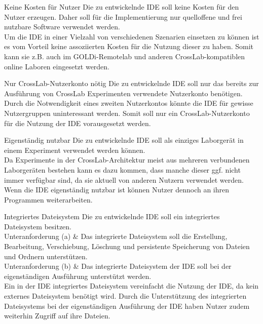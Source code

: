 \begin{requirement}{Keine Kosten für Nutzer}
    \reqdescription Die zu entwickelnde IDE soll keine Kosten für den Nutzer erzeugen. Daher soll für die Implementierung nur quelloffene und frei nutzbare Software verwendet werden.  \\
    \reqrationale Um die IDE in einer Vielzahl von verschiedenen Szenarien einsetzen zu können ist es vom Vorteil keine assoziierten Kosten für die Nutzung dieser zu haben. Somit kann sie z.B. auch im GOLDi-Remotelab und anderen CrossLab-kompatiblen online Laboren eingesetzt werden. \\
\end{requirement}

\begin{requirement}{Nur CrossLab-Nutzerkonto nötig}
    \reqdescription Die zu entwickelnde IDE soll nur das bereits zur Ausführung von CrossLab Experimenten verwendete Nutzerkonto benötigen. \\
    \reqrationale Durch die Notwendigkeit eines zweiten Nutzerkontos könnte die IDE für gewisse Nutzergruppen uninteressant werden. Somit soll nur ein CrossLab-Nutzerkonto für die Nutzung der IDE vorausgesetzt werden. \\
\end{requirement}

\begin{requirement}{Eigenständig nutzbar}
    \reqdescription Die zu entwickelnde IDE soll als einziges Laborgerät in einem Experiment verwendet werden können. \\
    \reqrationale Da Experimente in der CrossLab-Architektur meist aus mehreren verbundenen Laborgeräten bestehen kann es dazu kommen, dass manche dieser ggf. nicht immer verfügbar sind, da sie aktuell von anderen Nutzern verwendet werden. Wenn die IDE eigenständig nutzbar ist können Nutzer dennoch an ihren Programmen weiterarbeiten. \\
\end{requirement}

\begin{requirement}{Integriertes Dateisystem}
    \reqdescription Die zu entwickelnde IDE soll ein integriertes Dateisystem besitzen. \\
    Unteranforderung (a) & Das integrierte Dateisystem soll die Erstellung, Bearbeitung, Verschiebung, Löschung und persistente Speicherung von Dateien und Ordnern unterstützen. \\
    Unteranforderung (b) & Das integrierte Dateisystem der IDE soll bei der eigenständigen Ausführung unterstützt werden. \\
    \reqrationale Ein in der IDE integriertes Dateisystem vereinfacht die Nutzung der IDE, da kein externes Dateisystem benötigt wird. Durch die Unterstützung des integrierten Dateisystems bei der eigenständigen Ausführung der IDE haben Nutzer zudem weiterhin Zugriff auf ihre Dateien. \\
\end{requirement}

